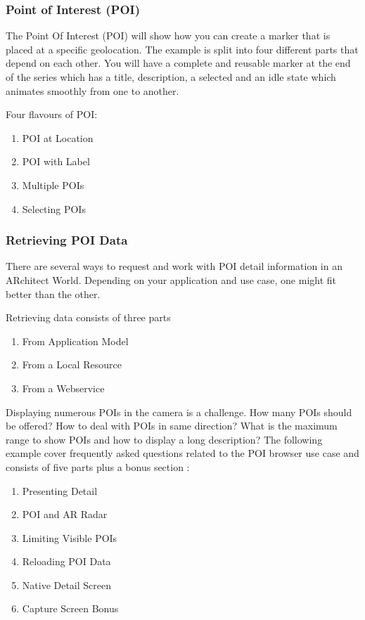 \documentclass{article}
\begin{document}
\subsubsection{Point of Interest (POI) }
\par The Point Of Interest (POI) will show how you can create a marker that is placed at a specific geolocation. The example is split into four different parts that depend on each other. You will have a complete and reusable marker at the end of the series which has a title, description, a selected and an idle state which animates smoothly from one to another. 
\par Four flavours of POI:
\begin{enumerate}
\item POI at Location 
\item POI with Label 
\item Multiple POIs 
\item Selecting POIs
\end{enumerate}

\subsubsection{Retrieving POI Data}
\par There are several ways to request and work with POI detail information in an ARchitect World. Depending on your application and use case, one might fit better than the other. 
\par Retrieving data consists of three parts 
\begin{enumerate}
\item From Application Model
\item From a Local Resource 
\item From a Webservice
\end{enumerate}
\par Displaying numerous POIs in the camera is a challenge. How many POIs should be offered? How to deal with POIs in same direction? What is the maximum range to show POIs and how to display a long description? The following example cover frequently asked questions related to the POI browser use case and consists of five parts plus a bonus section :
\begin{enumerate}
\item  Presenting Detail
\item POI and AR Radar 
\item  Limiting Visible POIs 
\item Reloading POI Data
\item  Native Detail Screen 
\item Capture Screen Bonus 
\end{enumerate}
\end{document}
